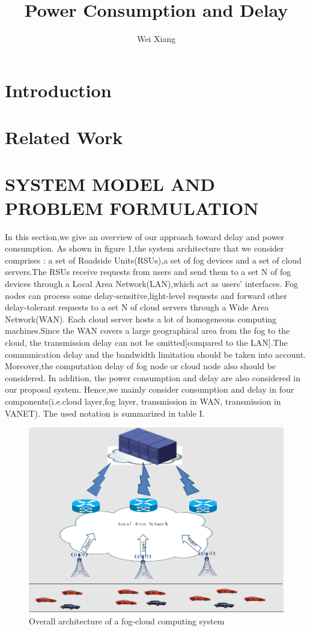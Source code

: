 \documentclass[twoside,twocolumn]{article}
\title{Power Consumption and Delay}
\author{Wei Xiang}  %
\begin{document}
\maketitle
\section{Introduction}
\section{Related Work}
\section{SYSTEM MODEL AND PROBLEM FORMULATION}
In this section,we give an overview of our approach toward  delay and power consumption. As shown in figure 1,the system architecture that we consider comprises : a set of Roadside Units(RSUs),a set of fog devices and a set of cloud servers.The RSUs receive requests from users and send them to a set N of fog devices through a Local Area Network(LAN),which act as users' interfaces. Fog nodes can process some delay-sensitive,light-level requests and forward other delay-tolerant requests to a set N of cloud servers through a Wide Area Network(WAN). Each cloud server hosts a lot of homogeneous computing machines.Since the WAN covers a large geographical area from the fog to the cloud, the transmission delay can not be omitted[compared to the LAN].The communication delay and the bandwidth limitation should be taken into account. Moreover,the computation delay of fog node or cloud node also should be considered. In addition, the power consumption and delay are also considered in our proposal system. Hence,we mainly consider consumption and delay in four components(i.e.cloud layer,fog layer, transmission in WAN, transmission in VANET). The used notation is summarized in table I.
\begin{figure}[h]
\centering
\includegraphics[scale=0.4]{4.png}
\caption{Overall architecture of a fog-cloud computing system}
\label{fig:label}
\end{figure}
\end{document}
